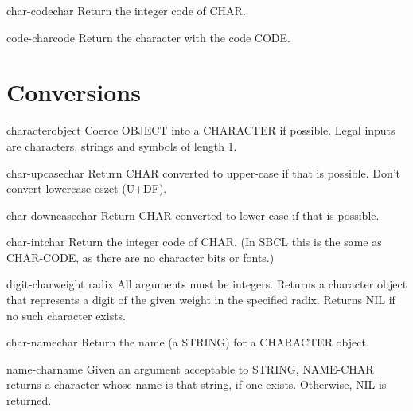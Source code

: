 \documentclass[10pt,english]{book}
\begin{document}
\begin{function}{char-code}{char}
  Return the integer code of CHAR.
\end{function}

\begin{function}{code-char}{code}
  Return the character with the code CODE.
\end{function}

\section{Conversions}
\label{sec:character-conversions}

\begin{function}{character}{object}
  Coerce OBJECT into a CHARACTER if possible. Legal inputs are
  characters, strings and symbols of length 1.
\end{function}

\begin{function}{char-upcase}{char}
  Return CHAR converted to upper-case if that is possible.  Don't convert
   lowercase eszet (U+DF).
\end{function}

\begin{function}{char-downcase}{char}
  Return CHAR converted to lower-case if that is possible.
\end{function}

\begin{function}{char-int}{char}
  Return the integer code of CHAR. (In SBCL this is the same as CHAR-CODE, as
   there are no character bits or fonts.)
\end{function}

\begin{function}{digit-char}{weight \op radix}
  All arguments must be integers. Returns a character object that
  represents a digit of the given weight in the specified radix. Returns
  NIL if no such character exists.
\end{function}

\begin{function}{char-name}{char}
  Return the name (a STRING) for a CHARACTER object.
\end{function}

\begin{function}{name-char}{name}
  Given an argument acceptable to STRING, NAME-CHAR returns a character
  whose name is that string, if one exists. Otherwise, NIL is returned.
\end{function}
\end{document}
